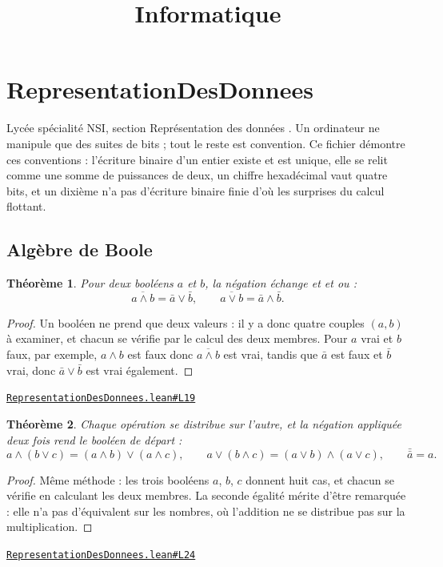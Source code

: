 \documentclass[11pt,a4paper]{article}
\title{Informatique}
\date{}
\theoremstyle{definition}
\theoremstyle{plain}
\newtheorem{theoreme}{Théorème}
\newcommand{\source}[2]{\par\smallskip\noindent\hfill{\footnotesize\href{#1}{\texttt{#2}}}\par\smallskip}
\begin{document}
\maketitle
\sloppy

\section{RepresentationDesDonnees}

\noindent
Lycée \textemdash{} spécialité NSI, section \og{} Représentation des données \fg{}.
Un ordinateur ne manipule que des suites de bits ; tout le reste est convention.
Ce fichier démontre ces conventions : l'écriture binaire d'un entier existe et est
unique, elle se relit comme une somme de puissances de deux, un chiffre hexadécimal
vaut quatre bits, et un dixième n'a pas d'écriture binaire finie \textemdash{} d'où les surprises
du calcul flottant.

\subsection{Algèbre de Boole}

\begin{theoreme}
Pour deux booléens $a$ et $b$, la négation échange \og{} et \fg{} et \og{} ou \fg{} :
\[ \overline{a \wedge b} = \bar a \vee \bar b, \qquad \overline{a \vee b} = \bar a \wedge \bar b . \]
\end{theoreme}
\begin{proof}
Un booléen ne prend que deux valeurs : il y a donc quatre couples $(a, b)$ à examiner,
et chacun se vérifie par le calcul des deux membres. Pour $a$ vrai et $b$ faux, par
exemple, $a \wedge b$ est faux donc $\overline{a \wedge b}$ est vrai, tandis que
$\bar a$ est faux et $\bar b$ vrai, donc $\bar a \vee \bar b$ est vrai également.
\end{proof}
\source{https://github.com/Commutator-IO/learn-lean/blob/main/courses/02-lycee/11-informatique-nsi/RepresentationDesDonnees.lean\#L19}{RepresentationDesDonnees.lean\#L19}

\begin{theoreme}
Chaque opération se distribue sur l'autre, et la négation appliquée deux fois rend le
booléen de départ :
\[ a \wedge (b \vee c) = (a \wedge b) \vee (a \wedge c), \qquad
   a \vee (b \wedge c) = (a \vee b) \wedge (a \vee c), \qquad
   \bar{\bar a} = a . \]
\end{theoreme}
\begin{proof}
Même méthode : les trois booléens $a$, $b$, $c$ donnent huit cas, et chacun se vérifie
en calculant les deux membres. La seconde égalité mérite d'être remarquée : elle n'a pas
d'équivalent sur les nombres, où l'addition ne se distribue pas sur la multiplication.
\end{proof}
\source{https://github.com/Commutator-IO/learn-lean/blob/main/courses/02-lycee/11-informatique-nsi/RepresentationDesDonnees.lean\#L24}{RepresentationDesDonnees.lean\#L24}
\end{document}

